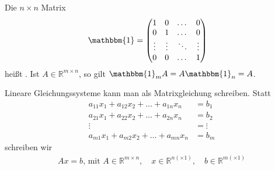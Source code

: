 Die $n \times n$ Matrix
\begin{align*}
    \mathbbm{1} &= \begin{pmatrix}
        1 & 0 & \dots & 0 \\
        0 & 1 & \dots & 0 \\
        \vdots & \vdots & \ddots & \vdots \\
        0 & 0 & \dots & 1
    \end{pmatrix}
\end{align*}
heißt . Ist $A \in \mathbb{R}^{m \times n}$, so gilt $\mathbbm{1}_m A = A \mathbbm{1}_n = A$.

Lineare Gleichungssysteme kann man als Matrixgleichung schreiben. Statt
\begin{align*}
    a_{11}x_1 + a_{12}x_2 + \dots + a_{1n}x_n &= b_1 \\
    a_{21}x_1 + a_{22}x_2 + \dots + a_{2n}x_n &= b_2 \\
    \vdots &= \vdots \\
    a_{m1}x_1 + a_{m2}x_2 + \dots + a_{mn}x_n &= b_m
\end{align*}
schreiben wir
\begin{align*}
    A x = b\text{, mit } A \in \mathbb{R}^{m \times n},\quad x \in \mathbb{R}^{n(\times 1)},\quad b \in \mathbb{R}^{m (\times 1)}
\end{align*}

